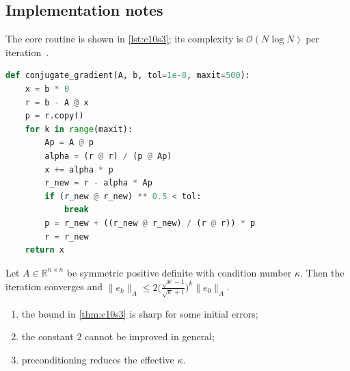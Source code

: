 \lipsum[33-34]

\subsection{Implementation notes}\label{sec:c10s3-i}
The core routine is shown in \cref{lst:c10s3}; its complexity is $\mathcal{O}(N\log N)$ per iteration~\cite{main-17}.

\begin{lstlisting}[language=python,caption={Reference implementation for c10s3.},label={lst:c10s3}]
def conjugate_gradient(A, b, tol=1e-8, maxit=500):
    x = b * 0
    r = b - A @ x
    p = r.copy()
    for k in range(maxit):
        Ap = A @ p
        alpha = (r @ r) / (p @ Ap)
        x += alpha * p
        r_new = r - alpha * Ap
        if (r_new @ r_new) ** 0.5 < tol:
            break
        p = r_new + ((r_new @ r_new) / (r @ r)) * p
        r = r_new
    return x
\end{lstlisting}

\lipsum[134-134]
\begin{theorem}\label{thm:c10s3}
Let $A\in\mathbb{R}^{n\times n}$ be symmetric positive definite with condition number $\kappa$. Then the iteration converges and
$\lVert e_k\rVert_A \le 2\bigl(\tfrac{\sqrt\kappa-1}{\sqrt\kappa+1}\bigr)^k\lVert e_0\rVert_A$.
\end{theorem}
\begin{enumerate}[label=(\roman*)]
\item the bound in \cref{thm:c10s3} is sharp for some initial errors;
\item the constant $2$ cannot be improved in general;
\item preconditioning reduces the effective $\kappa$.
\end{enumerate}

\lipsum[47-47]
